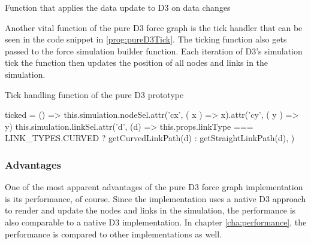 \begin{program}[th]
\caption{Function that applies the data update to D3 on data changes}
\label{prog:pureD3updateApply}
\end{program}

Another vital function of the pure D3 force graph is the tick handler that can be seen in the code snippet in \ref{prog:pureD3Tick}. The ticking function also gets passed to the force simulation builder function. Each iteration of D3's simulation tick the function then updates the position of all nodes and links in the simulation.

\begin{program}[th]
\caption{Tick handling function of the pure D3 prototype}
\label{prog:pureD3Tick}
\begin{JsCode}
ticked = () => {
  this.simulation.nodeSel.attr('cx', ({ x }) => x).attr('cy', ({ y }) => y)
  this.simulation.linkSel.attr('d', (d) =>
    this.props.linkType === LINK_TYPES.CURVED ? getCurvedLinkPath(d) : getStraightLinkPath(d),
  )
}
\end{JsCode}
\end{program}

\subsubsection{Advantages}

One of the most apparent advantages of the pure D3 force graph implementation is its performance, of course. Since the implementation uses a native D3 approach to render and update the nodes and links in the simulation, the performance is also comparable to a native D3 implementation. In chapter \ref{cha:performance}, the performance is compared to other implementations as well.

